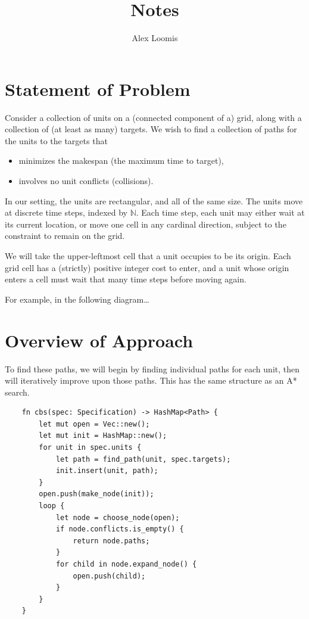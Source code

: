 \documentclass[12pt,letterpaper]{article}
\author{Alex Loomis}
\title{Notes}
\newcommand*{\N}{\mathbb N}
\begin{document}
\maketitle

\section{Statement of Problem}

Consider a collection of units on a (connected component of a) grid,
along with a collection of (at least as many) targets.
We wish to find a collection of paths for the units to the targets that
\begin{itemize}
	\item minimizes the makespan (the maximum time to target),
	\item involves no unit conflicts (collisions).
\end{itemize}

In our setting, the units are rectangular, and all of the same size.
The units move at discrete time steps, indexed by $\N$.
Each time step, each unit may either wait at its current location,
or move one cell in any cardinal direction,
subject to the constraint to remain on the grid.

We will take the upper-leftmost cell that a unit occupies to be its origin.
Each grid cell has a (strictly) positive integer cost to enter,
and a unit whose origin enters a cell must wait that many time steps before moving again.

For example, in the following diagram\dots

\section{Overview of Approach}

To find these paths, we will begin by finding individual paths for each unit,
then will iteratively improve upon those paths.
This has the same structure as an A* search.

\begin{lstlisting}
	fn cbs(spec: Specification) -> HashMap<Path> {
		let mut open = Vec::new();
		let mut init = HashMap::new();
		for unit in spec.units {
			let path = find_path(unit, spec.targets);
			init.insert(unit, path);
		}
		open.push(make_node(init));
		loop {
			let node = choose_node(open);
			if node.conflicts.is_empty() {
				return node.paths;
			}
			for child in node.expand_node() {
				open.push(child);
			}
		}
	}
\end{lstlisting}
\end{document}
